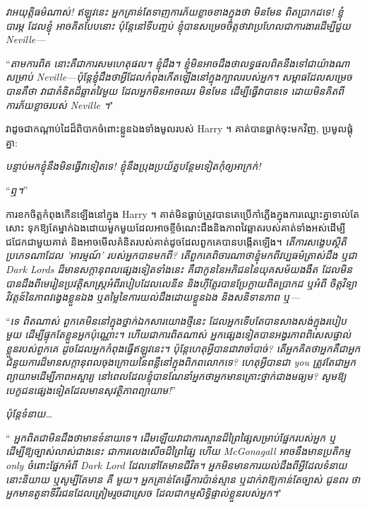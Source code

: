 {{{\emph{វាអយុត្តិធម៌ណាស់! ឥឡូវនេះ អ្នកគ្រាន់តែទាញការភ័យខ្លាចខាងក្នុងថា \emph{ មិនមែន} ពិតប្រាកដទេ! ខ្ញុំ \emph{បារម្ភ} ដែលខ្ញុំ \emph{អាច}គិតបែបនោះ ប៉ុន្តែនៅទីបញ្ចប់ ខ្ញុំបានសម្រេចចិត្តថាវាប្រហែលជា\emph{ការងារ}ដើម្បីជួយ Neville—}

“\emph{តាមការពិត នោះគឺជាការសមហេតុផល។ ខ្ញុំដឹង។ ខ្ញុំមិនអាចដឹងថាលទ្ធផលពិតនឹងទៅជាយ៉ាងណាសម្រាប់ Neville—ប៉ុន្តែខ្ញុំដឹងថាអ្វីដែលកំពុងកើតឡើងនៅក្នុងក្បាលរបស់អ្នក។ សម្ពាធដែលសម្រេចបានគឺថា វាជាគំនិតដ៏ឆ្លាតវៃមួយ ដែលអ្នកមិនអាចឈរ \emph{មិនមែន} ដើម្បីធ្វើវាបានទេ ដោយមិនគិតពីការភ័យខ្លាចរបស់ Neville ។}"

វា​ដូចជា​កណ្តាប់ដៃ​ដ៏​ពិបាក​ចំពោះ​ខ្លួនឯង​ទាំងមូល​របស់ Harry ។ គាត់បានធ្លាក់ចុះមកវិញ, ប្រមូលផ្តុំគ្នា:

\emph{បន្ទាប់មកខ្ញុំនឹងមិនធ្វើវាទៀតទេ! ខ្ញុំ​នឹង​ប្រុង​ប្រយ័ត្ន​បន្ថែម​ទៀត​កុំ​ឲ្យ​អាក្រក់!}

“\emph{ឮ។}”

ការខកចិត្តកំពុងកើនឡើងនៅក្នុង Harry ។ គាត់​មិន​ធ្លាប់​ត្រូវ​បាន​គេ​ប្រើ​កាំភ្លើង​ក្នុង​ការ​ឈ្លោះ​គ្នា​ទាល់​តែ​សោះ ទុក​ឱ្យ​តែ​ម្នាក់​ឯង​ដោយ​មួក​មួយ​ដែល​អាច​ខ្ចី​ចំណេះដឹង​និង​ភាព​វៃឆ្លាត​របស់​គាត់​ទាំង​អស់​ដើម្បី​ជជែក​ជាមួយ​គាត់ និង​អាច​មើល​គំនិត​របស់​គាត់​ដូច​ដែល​ពួក​គេ​បាន​បង្កើត​ឡើង។ \emph{តើការសង្ខេបស្ថិតិប្រភេទណាដែល 'អារម្មណ៍' របស់អ្នកបានមកពី? តើពួកគេពិចារណាថាខ្ញុំមកពីវប្បធម៌ត្រាស់ដឹង ឬជា Dark Lords ដ៏មានសក្តានុពលផ្សេងទៀតទាំងនេះ គឺជាកូននៃអភិជននៃយុគសម័យងងឹត ដែលមិនបានដឹងពីមេរៀនប្រវត្តិសាស្ត្រអំពីរបៀបដែលលេនីន និងហ៊ីត្លែរបានប្រែក្លាយពិតប្រាកដ ឬអំពី ចិត្តវិទ្យាវិវត្តន៍នៃភាពវង្វេងខ្លួនឯង ឬតម្លៃនៃការយល់ដឹងដោយខ្លួនឯង និងសនិទានភាព ឬ—}

“\emph{ទេ ពិតណាស់ ពួកគេមិននៅក្នុងថ្នាក់ឯកសារយោងថ្មីនេះ ដែលអ្នកទើបតែបានសាងសង់ក្នុងរបៀបមួយ ដើម្បីផ្ទុកតែខ្លួនអ្នកប៉ុណ្ណោះ។ ហើយជាការពិតណាស់ អ្នកផ្សេងទៀតបានអង្វរភាពពិសេសផ្ទាល់ខ្លួនរបស់ពួកគេ ដូចដែលអ្នកកំពុងធ្វើឥឡូវនេះ។ ប៉ុន្តែហេតុអ្វីបានជាវាចាំបាច់? តើអ្នកគិតថាអ្នកគឺជាអ្នកជំនួយការដ៏មានសក្តានុពលចុងក្រោយនៃពន្លឺនៅក្នុងពិភពលោកទេ? ហេតុអ្វីបានជា \emph{you} ត្រូវតែជាអ្នកព្យាយាមដើម្បីភាពអស្ចារ្យ នៅពេលដែលខ្ញុំបានណែនាំអ្នកថាអ្នកមានគ្រោះថ្នាក់ជាងមធ្យម? សូម​ឱ្យ​បេក្ខជន​ផ្សេង​ទៀត​ដែល​មាន​សុវត្ថិភាព​ព្យាយាម!}”

\emph{ប៉ុន្តែទំនាយ…}

“\emph{ អ្នកពិតជាមិនដឹងថាមានទំនាយទេ។ ដើមឡើយវាជាការស្មានដ៏ព្រៃផ្សៃសម្រាប់ផ្នែករបស់អ្នក ឬដើម្បីឱ្យច្បាស់លាស់ជាងនេះ ជាការលេងសើចដ៏ព្រៃផ្សៃ ហើយ McGonagall អាចនឹងមានប្រតិកម្ម\emph{ only} ចំពោះផ្នែកអំពី Dark Lord ដែលនៅតែមានជីវិត។ អ្នក​មិន​មាន​ការ​យល់​ដឹង​ពី​អ្វី​ដែល​ទំនាយ​នោះ​និយាយ ឬ​សូម្បី​តែ​មាន \emph{គឺ} មួយ​។ អ្នកគ្រាន់តែធ្វើការប៉ាន់ស្មាន ឬដាក់វាឱ្យកាន់តែច្បាស់ \emph{ជូនពរ} ថាអ្នកមានតួនាទីវីរជនដែលត្រៀមរួចជាស្រេច ដែលជាកម្មសិទ្ធិផ្ទាល់ខ្លួនរបស់អ្នក។}"

}}}
